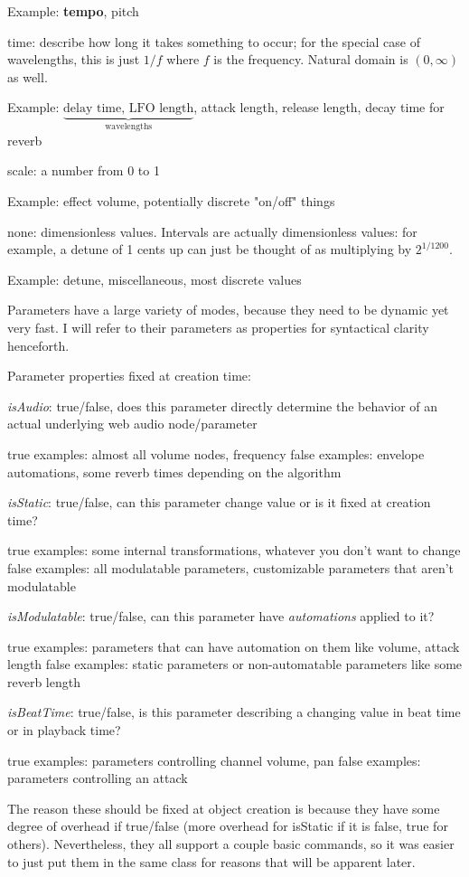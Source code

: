 \documentclass{article}
\begin{document}
Example: \textbf{tempo}, pitch

time: describe how long it takes something to occur; for the special case of wavelengths, this is just $1/f$ where $f$ is the frequency. Natural domain is $(0, \infty)$ as well.

Example: $\underbrace{\text{delay time, LFO length}}_{\text{wavelengths}}$, attack length, release length, decay time for reverb

scale: a number from 0 to 1

Example: effect volume, potentially discrete "on/off" things

none: dimensionless values. Intervals are actually dimensionless values: for example, a detune of 1 cents up can just be thought of as multiplying by $2^{1/1200}$.

Example: detune, miscellaneous, most discrete values

Parameters have a large variety of modes, because they need to be dynamic yet very fast. I will refer to their parameters as properties for syntactical clarity henceforth.

Parameter properties fixed at creation time:

\textit{isAudio}: true/false, does this parameter directly determine the behavior of an actual underlying web audio node/parameter

true examples: almost all volume nodes, frequency
false examples: envelope automations, some reverb times depending on the algorithm

\textit{isStatic}: true/false, can this parameter change value or is it fixed at creation time?

true examples: some internal transformations, whatever you don't want to change
false examples: all modulatable parameters, customizable parameters that aren't modulatable

\textit{isModulatable}: true/false, can this parameter have \textit{automations} applied to it?

true examples: parameters that can have automation on them like volume, attack length
false examples: static parameters or non-automatable parameters like some reverb length

\textit{isBeatTime}: true/false, is this parameter describing a changing value in beat time or in playback time?

true examples: parameters controlling channel volume, pan
false examples: parameters controlling an attack

The reason these should be fixed at object creation is because they have some degree of overhead if true/false (more overhead for isStatic if it is false, true for others). Nevertheless, they all support a couple basic commands, so it was easier to just put them in the same class for reasons that will be apparent later.
\end{document}

